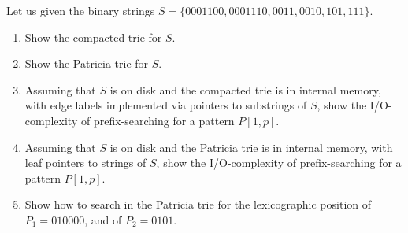 \exercise

Let us given the binary strings $S = \{ 0001100, 0001110, 0011, 0010, 101, 111
\}$.
%
\begin{enumerate}
  \item Show the compacted trie for $S$.
  \item Show the Patricia trie for $S$.

  \item Assuming that $S$ is on disk and the compacted trie is in internal memory,
  with edge labels implemented via pointers to substrings of $S$, show the
  I/O-complexity of prefix-searching for a pattern $P[1, p]$.

  \item Assuming that $S$ is on disk and the Patricia trie is in internal memory,
  with leaf pointers to strings of $S$, show the I/O-complexity of
  prefix-searching for a pattern $P[1, p]$.

  \item Show how to search in the Patricia trie for the lexicographic position
  of $P_1 = 010000$, and of $P_2 = 0101$.

\end{enumerate}

\solution

